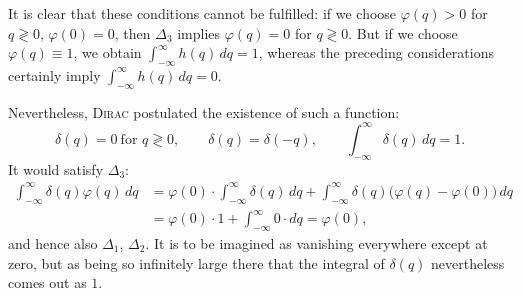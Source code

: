 \documentclass[fontsize=13pt,twoside,openany,headings=normal,parskip=false,bookmarkpackage=false,DIV=calc]{scrbook}
\begin{document}
It is clear that these conditions cannot be fulfilled: if we choose $\varphi(q)>0$ for $q\gtrless0$, $\varphi(0)=0$, then \hyperref[eq:I.3.D3]{$\Delta_3$} implies $\varphi(q)=0$ for $q\gtrless0$.
\hypertarget{origpage-14}{}%
But if we choose $\varphi(q)\equiv1$, we obtain $\int_{-\infty}^{\infty}h(q)\,dq=1$, whereas the preceding considerations certainly imply $\int_{-\infty}^{\infty}h(q)\,dq=0$.

Nevertheless, \textsc{Dirac} postulated the existence of such a function:
\begin{equation}
 \delta(q)=0\ \text{for }q\gtrless0,\qquad
 \delta(q)=\delta(-q),\qquad \int_{-\infty}^{\infty}\delta(q)\,dq=1.
 \tag{$\Delta_4$}\label{eq:I.3.D4}
\end{equation}
It would satisfy \hyperref[eq:I.3.D3]{$\Delta_3$}:
\begin{align*}
 \int_{-\infty}^{\infty}\delta(q)\varphi(q)\,dq
 &=\varphi(0)\cdot\int_{-\infty}^{\infty}\delta(q)\,dq
   +\int_{-\infty}^{\infty}\delta(q)\bigl(\varphi(q)-\varphi(0)\bigr)\,dq\\
 &=\varphi(0)\cdot1+\int_{-\infty}^{\infty}0\cdot dq=\varphi(0),
\end{align*}
and hence also \hyperref[eq:I.3.D1]{$\Delta_1$}, \hyperref[eq:I.3.D2]{$\Delta_2$}. It is to be imagined as vanishing everywhere except at zero, but as being so infinitely large there that the integral of $\delta(q)$ nevertheless comes out as $1$.
\end{document}
